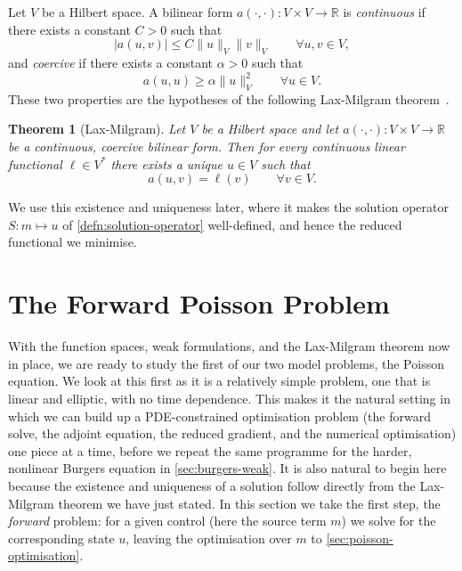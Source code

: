 \documentclass[a4paper,11pt]{article}
\newcommand{\R}{\mathbb{R}}
\theoremstyle{spacedplain} \newtheorem{theorem}[counter]{Theorem} \newtheorem{lemma}[counter]{Lemma} \newtheorem{prop}[counter]{Proposition} \newtheorem{cor}[counter]{Corollary}
\theoremstyle{spaceddefinition} \newtheorem{defn}[counter]{Definition} \newtheorem{example}[counter]{Example} \newtheorem{remark}[counter]{Remark}
\begin{document}
Let $V$ be a Hilbert space. A bilinear form $a(\cdot, \cdot) : V \times V \to \R$ is \emph{continuous} if there exists a constant $C > 0$ such that
\begin{equation}
  |a(u, v)| \le C \|u\|_V \|v\|_V
  \qquad \forall u, v \in V,
\end{equation}
and \emph{coercive} if there exists a constant $\alpha > 0$ such that
\begin{equation}
  a(u, u) \ge \alpha \|u\|_V^2
  \qquad \forall u \in V.
\end{equation}
These two properties are the hypotheses of the following Lax-Milgram theorem~\citep[Theorem~4.36]{hc2026}.

\begin{theorem}[Lax-Milgram]
Let $V$ be a Hilbert space and let $a(\cdot, \cdot) : V \times V \to \R$ be a continuous, coercive bilinear form. Then for every continuous linear functional $\ell \in V^{*}$ there exists a unique $u \in V$ such that
\begin{equation}
  a(u, v) = \ell(v) \qquad \forall v \in V.
\end{equation}
\end{theorem}

We use this existence and uniqueness later, where it makes the solution operator $S : m \mapsto u$ of \cref{defn:solution-operator} well-defined, and hence the reduced functional we minimise.

\section{The Forward Poisson Problem}
\label{sec:poisson-weak}

With the function spaces, weak formulations, and the Lax-Milgram theorem now in place, we are ready to study the first of our two model problems, the Poisson equation. We look at this first as it is a relatively simple problem, one that is linear and elliptic, with no time dependence. This makes it the natural setting in which we can build up a PDE-constrained optimisation problem (the forward solve, the adjoint equation, the reduced gradient, and the numerical optimisation) one piece at a time, before we repeat the same programme for the harder, nonlinear Burgers equation in \cref{sec:burgers-weak}. It is also natural to begin here because the existence and uniqueness of a solution follow directly from the Lax-Milgram theorem we have just stated. In this section we take the first step, the \emph{forward} problem: for a given control (here the source term $m$) we solve for the corresponding state $u$, leaving the optimisation over $m$ to \cref{sec:poisson-optimisation}.
\end{document}
